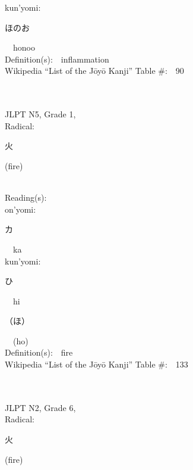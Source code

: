 \begin{multicols}{2}
{\hspace*{1em}}kun'yomi:\ \ \\
{\hspace*{2em}}{\begin{CJK}{UTF8}{min} ほのお \end{CJK}}\ \ honoo\ \ \\
Definition(s):\ \ inflammation \\
Wikipedia ``List of the J\=oy\=o Kanji'' Table \#:\ \ 90 \\
\ \ \\
{\fontsize{34pt}{40pt}  }\ \ \\  %
{JLPT N5, Grade 1, \\Radical:\ \ {\begin{CJK}{UTF8}{min} 火 \end{CJK}} (fire) } \\
Reading(s):\ \ \\
{\hspace*{1em}}on'yomi:\ \ \\
{\hspace*{2em}}{\begin{CJK}{UTF8}{min} カ \end{CJK}}\ \ ka\ \ \\
{\hspace*{1em}}kun'yomi:\ \ \\
{\hspace*{2em}}{\begin{CJK}{UTF8}{min} ひ \end{CJK}}\ \ hi\ \ \\
{\hspace*{2em}}{\begin{CJK}{UTF8}{min} （ほ） \end{CJK}}\ \ (ho)\ \ \\
Definition(s):\ \ fire \\
Wikipedia ``List of the J\=oy\=o Kanji'' Table \#:\ \ 133 \\
\ \ \\
{\fontsize{34pt}{40pt}  }\ \ \\  %
{JLPT N2, Grade 6, \\Radical:\ \ {\begin{CJK}{UTF8}{min} 火 \end{CJK}} (fire) } \\

\end{multicols}
